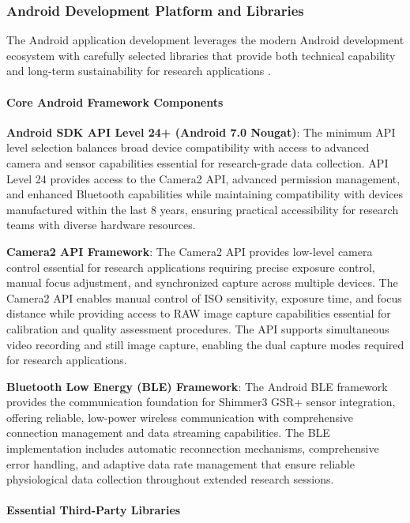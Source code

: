 \documentclass[11pt,a4paper]{report}
\begin{document}
\subsubsection{Android Development Platform and Libraries}

The Android application development leverages the modern Android development ecosystem with carefully selected libraries
that provide both technical capability and long-term sustainability for research applications .

\paragraph{Core Android Framework Components}

\textbf{Android SDK API Level 24+ (Android 7.0 Nougat)}: The minimum API level selection balances broad device compatibility
with access to advanced camera and sensor capabilities essential for research-grade data collection. API Level 24
provides access to the Camera2 API, advanced permission management, and enhanced Bluetooth capabilities while
maintaining compatibility with devices manufactured within the last 8 years, ensuring practical accessibility for
research teams with diverse hardware resources.

\textbf{Camera2 API Framework}: The Camera2 API provides low-level camera control essential for research applications
requiring precise exposure control, manual focus adjustment, and synchronized capture across multiple devices. The
Camera2 API enables manual control of ISO sensitivity, exposure time, and focus distance while providing access to RAW
image capture capabilities essential for calibration and quality assessment procedures. The API supports simultaneous
video recording and still image capture, enabling the dual capture modes required for research applications.

\textbf{Bluetooth Low Energy (BLE) Framework}: The Android BLE framework provides the communication foundation for Shimmer3
GSR+ sensor integration, offering reliable, low-power wireless communication with comprehensive connection management
and data streaming capabilities. The BLE implementation includes automatic reconnection mechanisms, comprehensive error
handling, and adaptive data rate management that ensure reliable physiological data collection throughout extended
research sessions.

\paragraph{Essential Third-Party Libraries}
\end{document}
